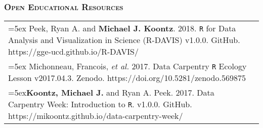 \documentclass[10pt,english]{article}
\providecommand{\tabularnewline}{\\}
\begin{document}
\vspace{1ex}

\subsubsection*{\textsc{Open Educational Resources}}
\vspace{-0.5ex}

\renewcommand{\arraystretch}{1.2}
\begin{tabularx}{\textwidth}{@{}>{\raggedright}p{5.25in} >{\raggedleft}X@{}}
\hangindent=5ex Peek, Ryan A. and \textbf{Michael J. Koontz}. 2018. \texttt{R} for Data Analysis and Visualization in Science (R-DAVIS) v1.0.0. GitHub. https://gge-ucd.github.io/R-DAVIS/ & 2018 \tabularnewline

\hangindent=5ex Michonneau, Francois, \emph{et al.} 2017. Data Carpentry \texttt{R} Ecology Lesson v2017.04.3. Zenodo. https://doi.org/10.5281/zenodo.569875 & 2017 \tabularnewline

\hangindent=5ex\textbf{Koontz, Michael J.} and Ryan A. Peek. 2017. Data Carpentry Week: Introduction to \texttt{R}. v1.0.0. GitHub. https://mikoontz.github.io/data-carpentry-week/ & 2017 \tabularnewline

\end{tabularx}
\end{document}

